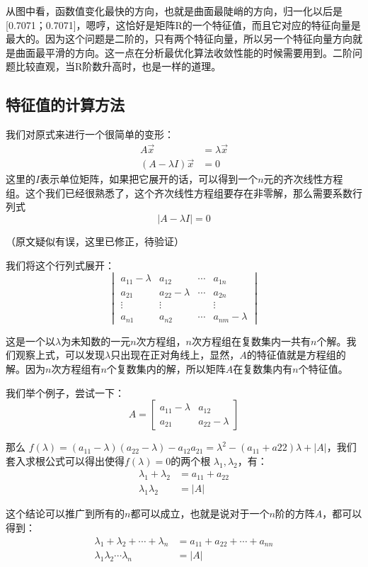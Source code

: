 \documentclass[12pt]{article}
\begin{document}
从图中看，函数值变化最快的方向，也就是曲面最陡峭的方向，归一化以后是[0.7071；0.7071]，嗯哼，这恰好是矩阵R的一个特征值，而且它对应的特征向量是最大的。因为这个问题是二阶的，只有两个特征向量，所以另一个特征向量方向就是曲面最平滑的方向。这一点在分析最优化算法收敛性能的时候需要用到。二阶问题比较直观，当R阶数升高时，也是一样的道理。

\subsection{特征值的计算方法}
我们对原式来进行一个很简单的变形：
\begin{align*}
    A\vec{x} &= \lambda\vec{x} \\
    (A - \lambda I)\vec{x} &= 0
\end{align*}
这里的$I$表示单位矩阵，如果把它展开的话，可以得到一个$n$元的齐次线性方程组。这个我们已经很熟悉了，这个齐次线性方程组要存在非零解，那么需要系数行列式
$$
|A - \lambda I| = 0
$$

（原文疑似有误，这里已修正，待验证）

我们将这个行列式展开：
$$
\begin{vmatrix}
a_{11} - \lambda & a_{12} & \cdots & a_{1n} \\
a_{21} & a_{22} - \lambda & \cdots & a_{2n} \\
\vdots & \vdots & & \vdots \\
a_{n1} & a_{n2} & \cdots & a_{nm} - \lambda
\end{vmatrix}
$$

这是一个以$\lambda$为未知数的一元$n$次方程组，$n$次方程组在复数集内一共有$n$个解。我们观察上式，可以发现$\lambda$只出现在正对角线上，显然，$A$的特征值就是方程组的解。因为$n$次方程组有$n$个复数集内的解，所以矩阵$A$在复数集内有$n$个特征值。

我们举个例子，尝试一下：
$$
A = 
\begin{bmatrix}
a_{11} - \lambda & a_{12} \\
a_{21} & a_{22} - \lambda
\end{bmatrix}
$$

那么 $f(\lambda) = (a_{11}-\lambda)(a_{22}-\lambda) - a_{12}a_{21} = \lambda^2 - (a_{11}+a{22})\lambda + |A|$，我们套入求根公式可以得出使得$f(\lambda)=0$的两个根 $\lambda_1, \lambda_2$，有：
\begin{align*}
    \lambda_1 + \lambda_2 &= a_{11} + a_{22} \\
    \lambda_1\lambda_2 &= |A|
\end{align*}

这个结论可以推广到所有的$n$都可以成立，也就是说对于一个$n$阶的方阵$A$，都可以得到：
\begin{align*}
    \lambda_1 + \lambda_2 + \cdots + \lambda_n &= a_{11} + a_{22} + \cdots + a_{nn} \\
    \lambda_1\lambda_2\cdots\lambda_n &= |A|
\end{align*}
\end{document}
